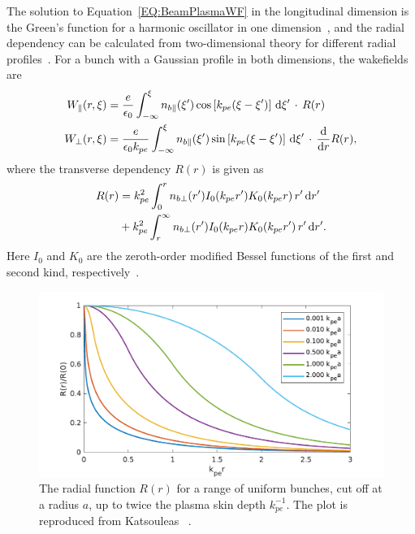 The solution to Equation~\ref{EQ:BeamPlasmaWF} in the longitudinal dimension is the Green’s function for a harmonic oscillator in one dimension~\cite{katsouleas:1987}, and the radial dependency can be calculated from two-dimensional theory for different radial profiles~\cite{chen:1987}.
For a bunch with a Gaussian profile in both dimensions, the wakefields are
\begin{align}
    W_{\parallel}(r,\xi) &= \frac{e}{\epsilon_{0}}
        \int_{-\infty}^{\xi} n_{b\parallel}(\xi^{\prime}) \cos\left[k_{pe}(\xi-\xi^{\prime})\right] \,\mathrm{d}\xi^{\prime} \,\cdot\, R(r) \label{EQ:WzFull} \\
    W_{\perp}(r,\xi) &= \frac{e}{\epsilon_{0}k_{pe}}
        \int_{-\infty}^{\xi} n_{b\parallel}(\xi^{\prime}) \sin\left[k_{pe}(\xi-\xi^{\prime})\right] \,\mathrm{d}\xi^{\prime} \,\cdot\, \frac{\mathrm{d}}{\mathrm{d}r}R(r), \label{EQ:WrFull}
\end{align}
where the transverse dependency $R(r)$ is given as
\begin{align}
    R(r) &= k_{pe}^{2} \int_{0}^{r} n_{b\perp}(r^{\prime}) I_{0}(k_{pe}r^{\prime})
           K_{0}(k_{pe}r) \,r^{\prime}\,\mathrm{d} r^{\prime} \nonumber \\
         &+ k_{pe}^{2} \int_{r}^{\infty} n_{b\perp}(r^{\prime}) I_{0}(k_{pe}r)
           K_{0}(k_{pe}r^{\prime}) \,r^{\prime}\,\mathrm{d} r^{\prime}. \label{EQ:WFRadial}
\end{align}
Here $I_{0}$ and $K_{0}$ are the zeroth-order modified Bessel functions of the first and second kind, respectively~\cite{chen:1987,muggli:2017}.

\begin{figure}[hbt]
    \centering
    \includegraphics[width=0.8125\linewidth,trim={0mm 0mm 0mm 0mm},clip]{figures/RepKatsouleas1987}
    \caption{\label{Fig:BPI:Kat87}
        The radial function $R(r)$ for a range of uniform bunches, cut off at a radius $a$, up to twice the plasma skin depth $k_{pe}^{-1}$.
        The plot is reproduced from Katsouleas \etal~\cite{katsouleas:1987}.
    }
\end{figure}

